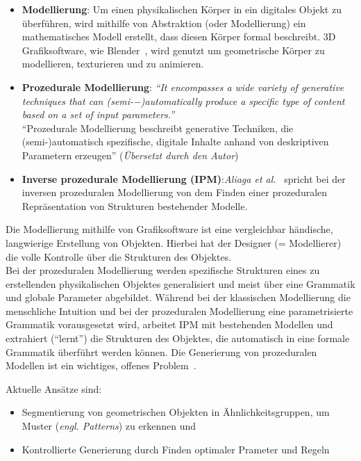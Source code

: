 \documentclass[11pt]{article}
\begin{document}
    \begin{itemize}
        \item \textbf{Modellierung}: Um einen physikalischen Körper in ein digitales Objekt zu überführen, wird mithilfe
        von Abstraktion (oder Modellierung) ein mathematisches Modell erstellt, dass diesen Körper formal beschreibt.
        3D Grafiksoftware, wie Blender~\cite{blender}, wird genutzt um geometrische Körper zu modellieren, texturieren
        und zu animieren.
        \item \textbf{Prozedurale Modellierung}: \textit{"`It encompasses a wide variety of generative techniques that
        can (semi-−)automatically produce a specific type of content based on a set of input
        parameters."'}~\cite{1} \\
        "`Prozedurale Modellierung beschreibt generative Techniken, die \\(semi-)automatisch spezifische, digitale
        Inhalte anhand von deskriptiven Parametern erzeugen"' (\textit{Übersetzt durch den Autor})
        \item \textbf{Inverse prozedurale Modellierung (IPM)}:\textit{Aliaga et al.}~\cite{2}
        spricht bei der inversen prozeduralen Modellierung von dem Finden einer prozeduralen Repräsentation von
        Strukturen bestehender Modelle.
    \end{itemize}
    Die Modellierung mithilfe von Grafiksoftware ist eine vergleichbar händische, langwierige Erstellung von
    Objekten.
    Hierbei hat der Designer (= Modellierer) die volle Kontrolle über die Strukturen des Objektes.\\
    Bei der prozeduralen Modellierung werden spezifische Strukturen eines zu erstellenden physikalischen Objektes
    generalisiert und meist über eine Grammatik und globale Parameter abgebildet.
    Während bei der klassischen Modellierung die menschliche Intuition und bei der prozeduralen Modellierung eine
    parametrisierte Grammatik vorausgesetzt wird, arbeitet IPM mit bestehenden Modellen und extrahiert ("`lernt"')
    die Strukturen des Objektes, die automatisch in eine formale Grammatik überführt werden können.
    Die Generierung von prozeduralen Modellen ist ein wichtiges, offenes Problem~\cite{2}.

    \newpage

    Aktuelle Ansätze sind:
    \begin{itemize}
        \item Segmentierung von geometrischen Objekten in Ähnlichkeitsgruppen, um Muster (\textit{engl. Patterns}) zu
        erkennen und
        \item Kontrollierte Generierung durch Finden optimaler Prameter und Regeln
    \end{itemize}
\end{document}
